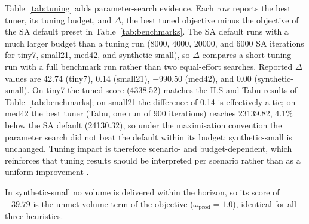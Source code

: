 Table~\ref{tab:tuning} adds parameter-search evidence. Each row reports the best tuner, its tuning budget, and $\Delta$, the best tuned objective minus the objective of the SA default preset in Table~\ref{tab:benchmarks}. The SA default runs with a much larger budget than a tuning run (8000, 4000, 20000, and 6000 SA iterations for tiny7, small21, med42, and synthetic-small), so $\Delta$ compares a short tuning run with a full benchmark run rather than two equal-effort searches. Reported $\Delta$ values are 42.74 (tiny7), 0.14 (small21), $-990.50$ (med42), and 0.00 (synthetic-small). On tiny7 the tuned score (4338.52) matches the ILS and Tabu results of Table~\ref{tab:benchmarks}; on small21 the difference of 0.14 is effectively a tie; on med42 the best tuner (Tabu, one run of 900 iterations) reaches 23139.82, 4.1\% below the SA default (24130.32), so under the maximisation convention the parameter search did not beat the default within its budget; synthetic-small is unchanged. Tuning impact is therefore scenario- and budget-dependent, which reinforces that tuning results should be interpreted per scenario rather than as a uniform improvement \cite{nelson2003forestmodels}.

In synthetic-small no volume is delivered within the horizon, so its score of $-39.79$ is the unmet-volume term of the objective ($\omega_{\text{prod}}=1.0$), identical for all three heuristics.

\begin{table}[t]
  \centering
  \small
  \setlength{\tabcolsep}{4pt}
  \caption{Solver performance across the reference scenarios. Objective values are compared within scenario (not across scenarios) because their scale differs by dataset and weight profile; only synthetic-small is negative (its score is the unmet-volume term). See the objective-weight and sign-convention note in Section~\ref{sec:software-description}.}
  \label{tab:benchmarks}
  \resizebox{\linewidth}{!}{
  
  }
\end{table}

\begin{table}[t]
  \centering
  \small
  \setlength{\tabcolsep}{4pt}
  \caption{Best-performing tuner per scenario with its tuning budget. $\Delta$ is the best tuned objective minus the objective of SA's default preset in Table~\ref{tab:benchmarks}, which uses a much larger SA budget (see the table note); negative $\Delta$ = worse than the default (med42).}
  \label{tab:tuning}
\end{table}

